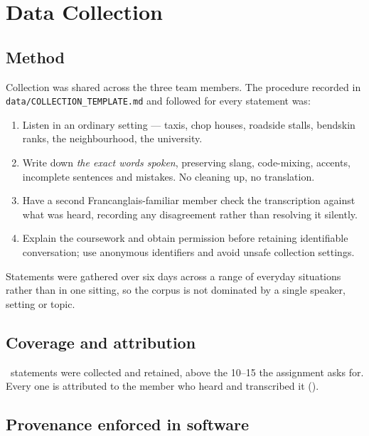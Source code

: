 \section{Data Collection}\label{c:data}

\subsection{Method}

Collection was shared across the three team members. The procedure recorded in
\texttt{data/\allowbreak COLLECTION\_\allowbreak TEMPLATE.md} and followed for every
statement was:

\begin{enumerate}[leftmargin=1.4em, itemsep=0.05em]
  \item Listen in an ordinary setting --- taxis, chop houses, roadside stalls, bendskin
        ranks, the neighbourhood, the university.
  \item Write down \emph{the exact words spoken}, preserving slang, code-mixing, accents,
        incomplete sentences and mistakes. No cleaning up, no translation.
  \item Have a second Francanglais-familiar member check the transcription against what
        was heard, recording any disagreement rather than resolving it silently.
  \item Explain the coursework and obtain permission before retaining identifiable
        conversation; use anonymous identifiers and avoid unsafe collection settings.
\end{enumerate}

Statements were gathered over six days across a range of everyday situations rather than
in one sitting, so the corpus is not dominated by a single speaker, setting or topic.

\subsection{Coverage and attribution}

\CorpusTotal\ statements were collected and retained, above the 10--15 the assignment asks
for. Every one is attributed to the member who heard and transcribed it ().

\begin{center}\end{center}

\subsection{Provenance enforced in software}

